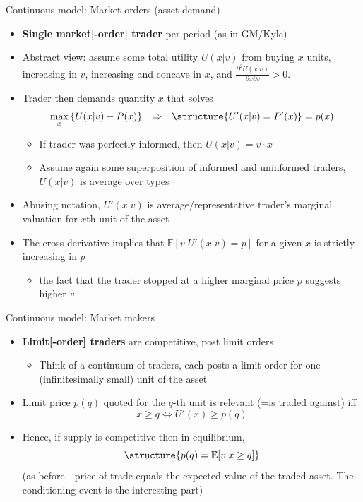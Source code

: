 \documentclass[english,10pt
,aspectratio=169
]{beamer}
\begin{document}
\begin{frame}{Continuous model: Market orders (asset demand)}
	\begin{itemize}
		\item \textbf{Single market[-order] trader} per period (as in GM/Kyle)
		\item Abstract view: assume some total utility $U(x|v)$ from buying $x$ units, increasing in $v$, increasing and concave in $x$, and $\frac{\partial^2 U(x|v)}{\partial x \partial v} > 0$.
		\item Trader then \alert{demands quantity $x$} that solves
		\begin{align*}
			\max_{x} \left\{ U(x|v) - P(x) \right\}
			&&
			\Rightarrow
			&&
			\structure{U'(x|v) = P'(x)} = p(x)
		\end{align*}\vspace{-0.6cm}
		\begin{itemize}
			\item If trader was perfectly informed, then $U(x|v) = v \cdot x$
			\item Assume again some superposition of informed and uninformed traders, $U(x|v)$ is average over types
		\end{itemize}
		\item Abusing notation, $U'(x|v)$ is average/representative trader's marginal valuation for $x$th unit of the asset
		\item The cross-derivative implies that $\mathbb{E}[v|U'(x|v) = p]$ for a given $x$ is strictly increasing in $p$
		\begin{itemize}
			\item the fact that the trader stopped at a higher marginal price $p$ suggests higher $v$
		\end{itemize}
	\end{itemize}
\end{frame}


\begin{frame}{Continuous model: Market makers}
\begin{itemize}	
	\item \textbf{Limit[-order] traders} are competitive, post limit orders
	\begin{itemize}
		\item Think of a continuum of traders, each posts a limit order for one (infinitesimally small) unit of the asset
	\end{itemize}
	\item Limit price $p(q)$ quoted for the $q$-th unit is relevant (=is traded against) iff $$x \geq q \iff U'(x) \geq p(q)$$
	\item Hence, if supply is competitive then in equilibrium,
	\[
	\structure{p(q) = \mathbb{E}[v| x \geq q]}
	\]
	(as before - price of trade equals the expected value of the traded asset. The conditioning event is the interesting part)
\end{itemize}
\end{frame}
\end{document}
